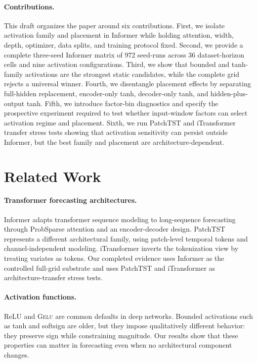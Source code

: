 \documentclass{article}
\newcommand{\gelu}{\textsc{Gelu}}
\newcommand{\patchtst}{PatchTST}
\newcommand{\itransformer}{iTransformer}
\begin{document}
\paragraph{Contributions.}
This draft organizes the paper around six contributions. First, we isolate activation family and placement in Informer while holding attention, width, depth, optimizer, data splits, and training protocol fixed. Second, we provide a complete three-seed Informer matrix of 972 seed-runs across 36 dataset-horizon cells and nine activation configurations. Third, we show that bounded and tanh-family activations are the strongest static candidates, while the complete grid rejects a universal winner. Fourth, we disentangle placement effects by separating full-hidden replacement, encoder-only tanh, decoder-only tanh, and hidden-plus-output tanh. Fifth, we introduce factor-bin diagnostics and specify the prospective experiment required to test whether input-window factors can select activation regime and placement. Sixth, we run \patchtst{} and \itransformer{} transfer stress tests showing that activation sensitivity can persist outside Informer, but the best family and placement are architecture-dependent.



\section{Related Work}

\paragraph{Transformer forecasting architectures.}
Informer \citep{zhou2021informer} adapts transformer sequence modeling \citep{vaswani2017attention} to long-sequence forecasting through ProbSparse attention and an encoder-decoder design. \patchtst{} \citep{nie2023patchtst} represents a different architectural family, using patch-level temporal tokens and channel-independent modeling. \itransformer{} \citep{liu2023itransformer} inverts the tokenization view by treating variates as tokens. Our completed evidence uses Informer as the controlled full-grid substrate and uses \patchtst{} and \itransformer{} as architecture-transfer stress tests.

\paragraph{Activation functions.}
ReLU \citep{nair2010relu} and \gelu{} \citep{hendrycks2016gelu} are common defaults in deep networks. Bounded activations such as tanh and softsign are older, but they impose qualitatively different behavior: they preserve sign while constraining magnitude. Our results show that these properties can matter in forecasting even when no architectural component changes.
\end{document}
